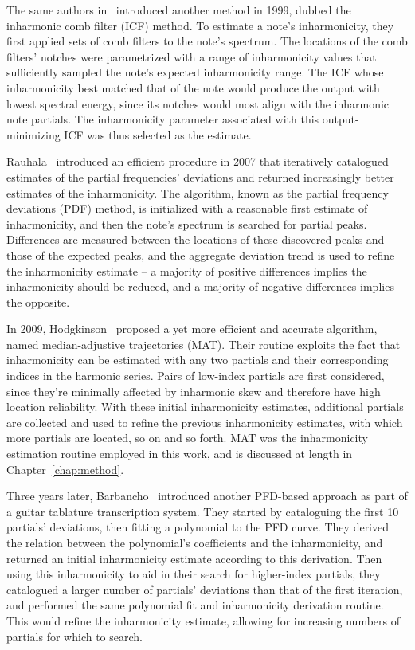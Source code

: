 \documentclass[12pt]{cmuthesis}
\begin{document}
 The same authors in~\cite{galembo1999} introduced another method in 1999, dubbed the inharmonic comb filter (ICF) method. To estimate a note's inharmonicity, they first applied sets of comb filters to the note's spectrum. The locations of the comb filters' notches were parametrized with a range of inharmonicity values that sufficiently sampled the note's expected inharmonicity range. The ICF whose inharmonicity best matched that of the note would produce the output with lowest spectral energy, since its notches would most align with the inharmonic note partials. The inharmonicity parameter associated with this output-minimizing ICF was thus selected as the estimate.
 
Rauhala~\cite{rauhala2007} introduced an efficient procedure in 2007 that iteratively catalogued estimates of the partial frequencies' deviations and returned increasingly better estimates of the inharmonicity. The algorithm, known as the partial frequency deviations (PDF) method, is initialized with a reasonable first estimate of inharmonicity, and then the note's spectrum is searched for partial peaks. Differences are measured between the locations of these discovered peaks and those of the expected peaks, and the aggregate deviation trend is used to refine the inharmonicity estimate -- a majority of positive differences implies the inharmonicity should be reduced, and a majority of negative differences implies the opposite.

In 2009, Hodgkinson~\cite{hodgkinson2009} proposed a yet more efficient and accurate algorithm, named median-adjustive trajectories (MAT). Their routine exploits the fact that inharmonicity can be estimated with any two partials and their corresponding indices in the harmonic series. Pairs of low-index partials are first considered, since they're minimally affected by inharmonic skew and therefore have high location reliability. With these initial inharmonicity estimates, additional partials are collected and used to refine the previous inharmonicity estimates, with which more partials are located, so on and so forth. MAT was the inharmonicity estimation routine employed in this work, and is discussed at length in Chapter~\ref{chap:method}.

Three years later, Barbancho~\cite{barbanchoi2012} introduced another PFD-based approach as part of a guitar tablature transcription system. They started by cataloguing the first 10 partials' deviations, then fitting a polynomial to the PFD curve. They derived the relation between the polynomial's coefficients and the inharmonicity, and returned an initial inharmonicity estimate according to this derivation. Then using this inharmonicity to aid in their search for higher-index partials, they catalogued a larger number of partials' deviations than that of the first iteration, and performed the same polynomial fit and inharmonicity derivation routine. This would refine the inharmonicity estimate, allowing for increasing numbers of partials for which to search.
\end{document}
